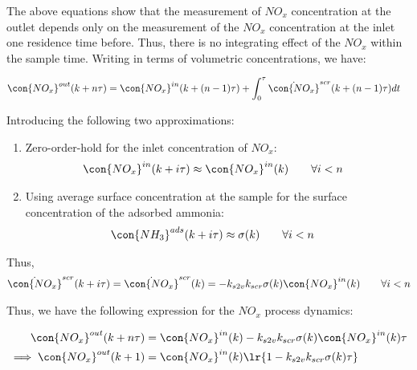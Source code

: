 The above equations show that the measurement of $NO_x$ concentration at the outlet depends only on the measurement of
the $NO_x$ concentration at the inlet one residence time before. Thus, there is no integrating effect of the $NO_x$
within the sample time. Writing in terms of volumetric concentrations, we have:

\begin{align*}
    \con{NO_x}^{out} (k + n\tau) &= \con{NO_x}^{in} (k + (n-1)\tau) + \int_{0}^{\tau}  \dot{\con{NO_x}}^{scr} (k + (n-1)\tau) dt
\end{align*}

Introducing the following two approximations:
\begin{enumerate}
    \item Zero-order-hold for the inlet concentration of $NO_x$:
        \begin{align*}
            \con{NO_x}^{in} (k + i \tau) &\approx \con{NO_x}^{in} (k) \qquad \forall i < n
        \end{align*}
    \item Using average surface concentration at the sample for the surface concentration of the adsorbed ammonia:
        \begin{align*}
            \con{NH_3}^{ads} (k + i \tau) &\approx \sigma(k) \qquad \forall i < n
        \end{align*}
\end{enumerate}

Thus,
\begin{align*}
    \dot{\con{NO_x}}^{scr} (k + i \tau) =  \dot{\con{NO_x}}^{scr} (k) = -k_{s2v} k_{scr} \sigma(k) \con{NO_x}^{in} (k) \qquad \forall i < n
\end{align*}


Thus, we have the following expression for the $NO_x$ process dynamics:

\begin{align*}
    \con{NO_x}^{out} (k + n\tau) &= \con{NO_x}^{in} (k) - k_{s2v} k_{scr} \sigma(k) \con{NO_x}^{in} (k) \tau\\
    \implies \con{NO_x}^{out} (k + 1) &= \con{NO_x}^{in} (k) \lr{1 - k_{s2v} k_{scr} \sigma(k) \tau}
\end{align*}


